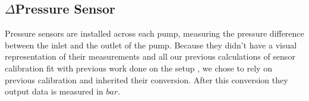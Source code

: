 \subsection*{$\Delta$Pressure Sensor}
Pressure sensors are installed across each pump,
measuring the pressure difference between the inlet and the outlet of the pump.
Because they didn't have a visual representation of their measurements
and all our previous calculations of sensor calibration fit with previous work done on the setup
,
we chose to rely on previous calibration and inherited their conversion.
After this conversion they output data is measured in $bar$.